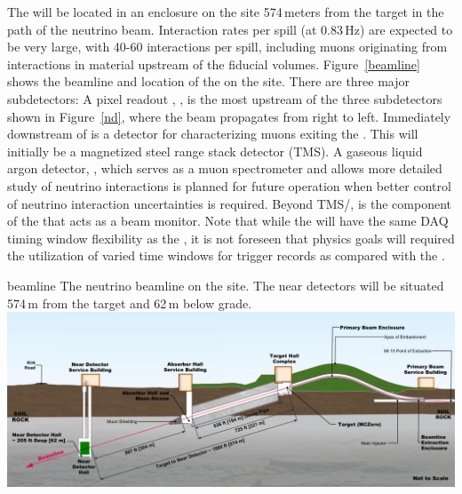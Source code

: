 \documentclass[../main-v1.tex]{subfiles}
\begin{document}
 The   will be located in an enclosure on the  site 574\,meters from the target %
 in the path of the neutrino beam.    Interaction rates per spill (at 0.83\,Hz) are expected to be very large, with 40-60 interactions per spill, including muons originating from interactions in material upstream of the fiducial volumes. Figure~\ref{beamline} shows the beamline and location of the  on the  site. There are three major subdetectors:
 A pixel readout %
 , , is  the most upstream of the three subdetectors shown in Figure~\ref{nd}, where the beam propagates  from right to left. Immediately downstream of  is a detector for characterizing muons exiting the . This will initially be a magnetized steel range stack detector (TMS). A gaseous liquid argon detector, , which serves %
 as  a muon spectrometer and allows more detailed study of neutrino interactions is planned for future operation when better control of neutrino interaction uncertainties is required. %
 Beyond TMS/, is the  component of the  that acts as a beam monitor. %
Note that while the  will have the same DAQ timing window flexibility as the , it is not foreseen that  physics goals will required the utilization of varied time windows for trigger records as compared with the . %


 \begin{dunefigure}
{beamline} %
{The neutrino beamline on the  site. The near detectors will be situated 574\,m from the target and 62\,m below grade.}
\includegraphics[height=0.3\textwidth]{graphics/IntroFigures/beamline-sideview.png}
\end{dunefigure}
\end{document}
